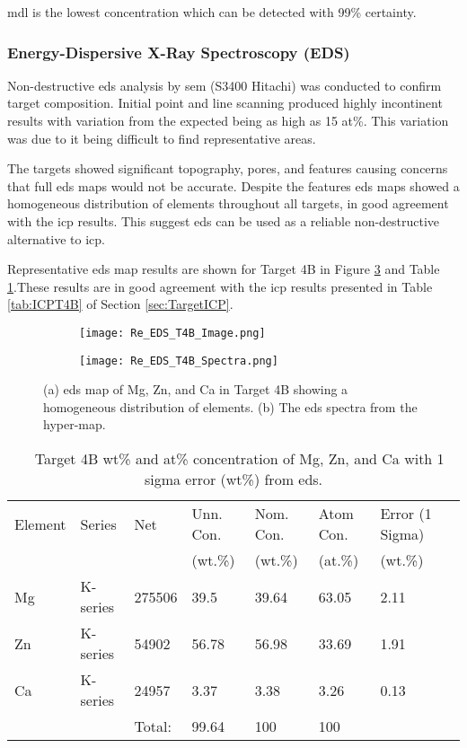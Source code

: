 \documentclass[a4paper,12pt,oneside]{report}%
\begin{document}
\Gls{mdl} is the lowest concentration which can be detected with 99\% certainty.

\subsubsection{Energy-Dispersive X-Ray Spectroscopy (EDS)}
Non-destructive \gls{eds} analysis by \gls{sem} (S3400 Hitachi) was conducted to confirm target composition. Initial point and line scanning produced highly incontinent results with variation from the expected being as high as 15 at\%. This variation was due to it being difficult to find representative areas. 

The targets showed significant topography, pores, and features causing concerns that full \gls{eds} maps would not be accurate. Despite the features \gls{eds} maps showed a homogeneous distribution of elements throughout all targets, in good agreement with the \gls{icp} results. This suggest \gls{eds} can be used as a reliable non-destructive alternative to \gls{icp}.

Representative \gls{eds} map results are shown for Target 4B in Figure \ref{fig:EDST4B} and Table \ref{tab:EDST4}.These results are in good agreement with the \gls{icp} results presented in Table \ref{tab:ICPT4B} of Section \ref{sec:TargetICP}.

\begin{figure}[htbp]
	\centering
	\begin{subfigure}[htbp]{0.49\textwidth}
		\texttt{[image: Re\_EDS\_T4B\_Image.png]}
		\caption{}
		\label{fig:EDST4B_Micro}
	\end{subfigure}
	\begin{subfigure}[htbp]{0.49\textwidth}
		\texttt{[image: Re\_EDS\_T4B\_Spectra.png]}
		\caption{}
		\label{fig:EDST4B_Spectra}
	\end{subfigure}
	\caption{(a) \acrshort{eds} map of Mg, Zn, and Ca in Target 4B showing a homogeneous distribution of elements. (b) The \acrshort{eds} spectra from the hyper-map.}%
	\label{fig:EDST4B}
\end{figure}


\begin{table}[H]
	\centering
	\begin{tabular}{llllllll}
		\toprule
		Element & Series & Net & Unn. Con. & Nom. Con. & Atom Con. & Error (1 Sigma)\\
		& & & (wt.\%) & (wt.\%) & (at.\%) & (wt.\%) \\
		\midrule
		Mg & K-series & 275506 & 39.5 & 39.64 & 63.05 & 2.11 \\
		Zn & K-series & 54902  & 56.78  & 56.98  & 33.69 & 1.91  \\
		Ca & K-series & 24957  & 3.37 & 3.38  & 3.26 & 0.13  \\
		\midrule
		&  & Total:   & 99.64 & 100  & 100  & \\
		\bottomrule                
	\end{tabular}
	\caption{\MgZnCa~ Target 4B wt\% and at\% concentration of Mg, Zn, and Ca with 1 sigma error (wt\%) from \acrshort{eds}.}
	\label{tab:EDST4}
\end{table}
\end{document}
